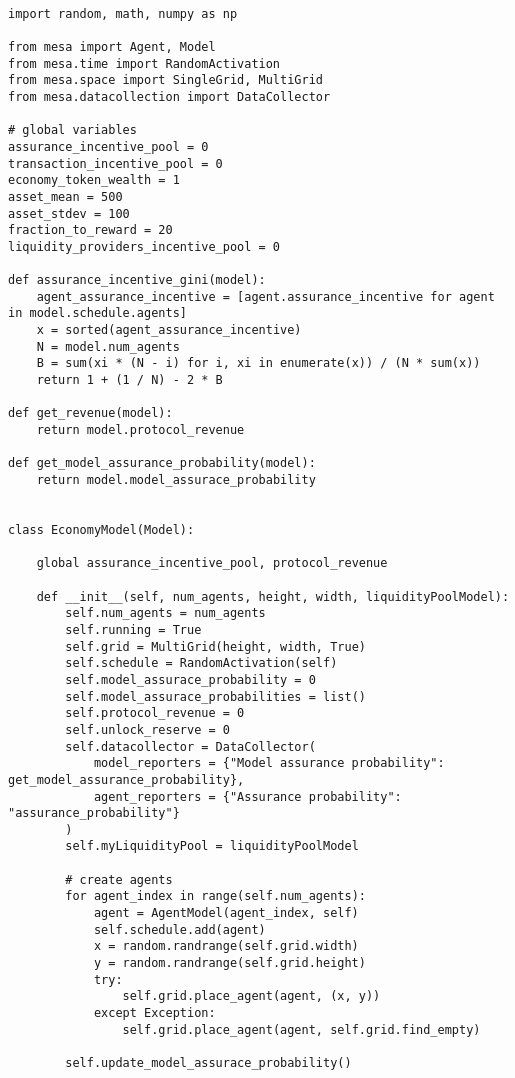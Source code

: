 \documentclass{article}
\begin{document}
\begin{lstlisting}

import random, math, numpy as np

from mesa import Agent, Model
from mesa.time import RandomActivation
from mesa.space import SingleGrid, MultiGrid
from mesa.datacollection import DataCollector

# global variables
assurance_incentive_pool = 0
transaction_incentive_pool = 0
economy_token_wealth = 1
asset_mean = 500
asset_stdev = 100
fraction_to_reward = 20 
liquidity_providers_incentive_pool = 0

def assurance_incentive_gini(model):
    agent_assurance_incentive = [agent.assurance_incentive for agent in model.schedule.agents]
    x = sorted(agent_assurance_incentive)
    N = model.num_agents
    B = sum(xi * (N - i) for i, xi in enumerate(x)) / (N * sum(x))
    return 1 + (1 / N) - 2 * B

def get_revenue(model):
    return model.protocol_revenue

def get_model_assurance_probability(model):
    return model.model_assurace_probability


class EconomyModel(Model):

    global assurance_incentive_pool, protocol_revenue

    def __init__(self, num_agents, height, width, liquidityPoolModel):
        self.num_agents = num_agents
        self.running = True
        self.grid = MultiGrid(height, width, True)
        self.schedule = RandomActivation(self)
        self.model_assurace_probability = 0
        self.model_assurace_probabilities = list()
        self.protocol_revenue = 0
        self.unlock_reserve = 0
        self.datacollector = DataCollector(
            model_reporters = {"Model assurance probability": get_model_assurance_probability},
            agent_reporters = {"Assurance probability": "assurance_probability"}
        )
        self.myLiquidityPool = liquidityPoolModel
        
        # create agents
        for agent_index in range(self.num_agents):
            agent = AgentModel(agent_index, self)
            self.schedule.add(agent)
            x = random.randrange(self.grid.width)
            y = random.randrange(self.grid.height)
            try:
                self.grid.place_agent(agent, (x, y))
            except Exception:
                self.grid.place_agent(agent, self.grid.find_empty)
        
        self.update_model_assurace_probability()
    

\end{lstlisting}
\end{document}
